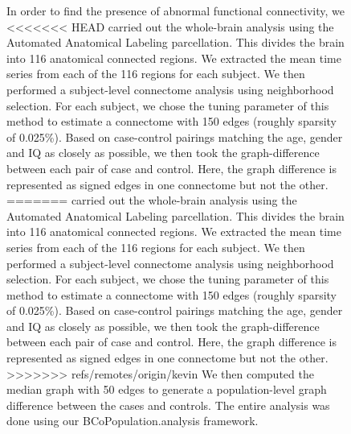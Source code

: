 \documentclass{nature}
\begin{document}
{\begin{figure}[tb]
In order to find the presence of abnormal functional connectivity, we 
<<<<<<< HEAD
carried out the whole-brain analysis using the Automated Anatomical Labeling\cite{tzourio2002automated} parcellation. This divides the brain into
116 anatomical connected regions. We extracted the mean time series from each
of the 116 regions for each subject. We then performed a subject-level connectome
analysis using neighborhood selection\cite{meinshausen2006high}. For
each subject, we chose the tuning
parameter of this method to estimate a connectome with 150 edges (roughly sparsity
of 0.025\%). 
Based on case-control pairings matching the age, gender and IQ as closely as possible,
we then took the graph-difference between each pair of case and control. Here,
the graph difference is represented as signed edges in one connectome but not the other. 
=======
carried out the whole-brain analysis using the Automated Anatomical
Labeling\cite{tzourio2002automated} parcellation. This divides the brain into
116 anatomical connected regions. We extracted the mean time series from each
of the 116 regions for each subject. We then performed a subject-level
connectome
analysis using neighborhood selection\cite{meinshausen2006high}. For
each subject, we chose the tuning
parameter of this method to estimate a connectome with 150 edges (roughly
sparsity
of 0.025\%). 
Based on case-control pairings matching the age, gender and IQ as closely as
possible,
we then took the graph-difference between each pair of case and control. Here,
the graph difference is represented as signed edges in one connectome but not
the other. 
>>>>>>> refs/remotes/origin/kevin
We then computed the median graph\cite{han2013sparse} with 
50 edges 
to generate a population-level graph difference between the cases and controls.
The entire analysis was done using our BCoPopulation.analysis framework.


\end{figure}}
\end{document}
